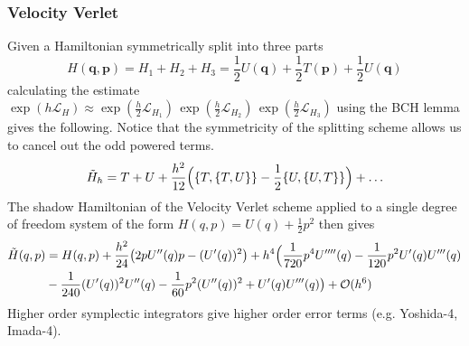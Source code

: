 \documentclass{article}
\theoremstyle{remark}
\theoremstyle{definition}
\begin{document}
\subsubsection{Velocity Verlet}
Given a Hamiltonian symmetrically split into three parts
\[H(\mathbf{q}, \mathbf{p}) =  H_1 + H_2 + H_3 = \frac{1}{2} U(\mathbf{q}) + \frac{1}{2} T(\mathbf{p}) + \frac{1}{2} U(\mathbf{q})\]
calculating the estimate $\exp{(h \mathcal{L}_H)} \approx \exp(\frac{h}{2} \mathcal{L}_{H_1})\,\exp(\frac{h}{2} \mathcal{L}_{H_2})\,\exp(\frac{h}{2} \mathcal{L}_{H_3})$ using the BCH lemma gives the following. Notice that the symmetricity of the splitting scheme allows us to cancel out the odd powered terms. 
\[\Tilde{H}_h = T + U + \frac{h^2}{12} \Big( \{ T, \{T, U\}\} - \frac{1}{2} \{U, \{U, T\}\} \Big) + \ldots \]
The shadow Hamiltonian of the Velocity Verlet scheme applied to a single degree of freedom system of the form $H(q, p) = U(q) + \frac{1}{2} p^2$ then gives 
\begin{align*}
    \Tilde{H}(q, p) & = H(q, p) + \frac{h^2}{24} \big(2 p U'' (q) p - (U^\prime (q))^2 \big) + h^4 \Big( \frac{1}{720} p^4 U''''(q) - \frac{1}{120} p^2 U'(q) U'''(q) \\
    & - \frac{1}{240} (U'(q))^2 U''(q) - \frac{1}{60} p^2 (U''(q))^2 + U'(q) U'''(q) \big) + \mathcal{O}(h^6) 
\end{align*}
Higher order symplectic integrators give higher order error terms (e.g. Yoshida-4, Imada-4). 
\end{document}
